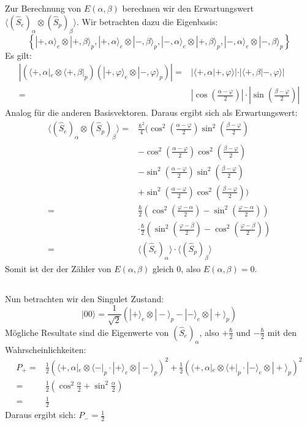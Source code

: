 \documentclass[11pt, ngerman, fleqn, DIV=15, headinclude]{scrartcl}
\begin{document}
\subsection{}
	Zur Berechnung von $E(\alpha,\beta)$ berechnen wir den Erwartungswert $\langle(\hat{S}_e)_\alpha\otimes(\hat{S}_p)_\beta\rangle$. Wir betrachten dazu die Eigenbasis:
	\[ \left\{ |+,\alpha\rangle_e\otimes|+,\beta\rangle_p, |+,\alpha\rangle_e\otimes|-,\beta\rangle_p, |-,\alpha\rangle_e\otimes|+,\beta\rangle_p, |-,\alpha\rangle_e\otimes|-,\beta\rangle_p\right\} \]
	Es gilt:
	\begin{align*}
	 |(\langle+,\alpha|_e\otimes\langle+,\beta|_p)(|+,\varphi\rangle_e\otimes|-,\varphi\rangle_p)|= 	&| \langle+,\alpha|+,\varphi\rangle|\cdot|\langle+,\beta|-,\varphi\rangle| \\
			=& \left|\cos\left(\frac{\alpha-\varphi}{2}\right)\right|\cdot\left|\sin\left(\frac{\beta-\varphi}{2}\right)\right|
	\end{align*}
	Analog für die anderen Basisvektoren. Daraus ergibt sich als Erwartungswert:
	\begin{align*}
		\langle(\hat{S}_e)_\alpha\otimes(\hat{S}_p)_\beta\rangle=&
			\frac{\hbar^2}{4}(\cos^2\left(\frac{\alpha-\varphi}{2}\right)\sin^2\left(\frac{\beta-\varphi}{2}\right) \\ &-\cos^2\left(\frac{\alpha-\varphi}{2}\right)\cos^2\left(\frac{\beta-\varphi}{2}\right) \\& -\sin^2\left(\frac{\alpha-\varphi}{2}\right)\sin^2\left(\frac{\beta-\varphi}{2}\right)\\&+\sin^2\left(\frac{\alpha-\varphi}{2}\right)\cos^2\left(\frac{\beta-\varphi}{2}\right)) \\
				=& \frac{\hbar}{2}\left(\cos^2\left(\frac{\varphi-\alpha}{2}\right)-\sin^2\left(\frac{\varphi-\alpha}{2}\right)\right) \\ &\cdot\frac{\hbar}{2}\left(\sin^2\left(\frac{\varphi-\beta}{2}\right)-\cos^2\left(\frac{\varphi-\beta}{2}\right)\right)\\
				=& \langle(\hat{S}_e)_\alpha\rangle\cdot \langle(\hat{S}_p)_\beta\rangle
	\end{align*}
	Somit ist der der Zähler von $E(\alpha,\beta)$ gleich 0, also $E(\alpha,\beta)=0$.

\subsection{}
	Nun betrachten wir den Singulet Zustand:
	\[ |00\rangle=\frac{1}{\sqrt{2}}(|+\rangle_e\otimes|-\rangle_p-|-\rangle_e\otimes|+\rangle_p) \]
	Mögliche Resultate sind die Eigenwerte von $(\hat{S}_e)_\alpha$, also $+\frac{\hbar}{2}$ und $-\frac{\hbar}{2}$ mit den Wahrscheinlichkeiten:
	\begin{align*}
		P_+=&\frac{1}{2}\left(\langle+,\alpha|_e\otimes\langle-|_p\cdot |+\rangle_e\otimes|-\rangle_p\right)^2+ \frac{1}{2} \left (\langle+,\alpha|_e\otimes\langle+|_p\cdot|-\rangle_e\otimes|+\rangle_p\right)^2 \\
			=&\frac{1}{2}\left(\cos^2\frac{\alpha}{2}+\sin^2\frac{\alpha}{2}\right) \\
			=& \frac{1}{2}
	\end{align*}
	Daraus ergibt sich: $P_-=\frac{1}{2}$
\end{document}
